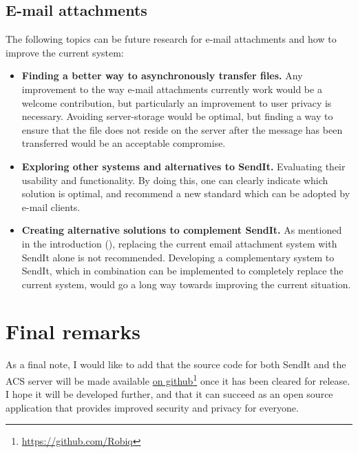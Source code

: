 \subsection{E-mail attachments}
%
The following topics can be future research for e-mail attachments and how to improve the current system:
\begin{itemize}
	\item \textbf{Finding a better way to asynchronously transfer files.} Any improvement to the way e-mail attachments currently work would be a welcome contribution, but particularly an improvement to user privacy is necessary. Avoiding server-storage would be optimal, but finding a way to ensure that the file does not reside on the server after the message has been transferred would be an acceptable compromise.
	\item \textbf{Exploring other systems and alternatives to SendIt.} Evaluating their usability and functionality. By doing this, one can clearly indicate which solution is optimal, and recommend a new standard which can be adopted by e-mail clients.
	\item \textbf{Creating alternative solutions to complement SendIt.} As mentioned in the introduction (), replacing the current email attachment system with SendIt alone is not recommended. Developing a complementary system to SendIt, which in combination can be implemented to completely replace the current system, would go a long way towards improving the current situation.
\end{itemize}
%
\section{Final remarks}
%
As a final note, I would like to add that the source code for both SendIt and the ACS server will be made available \href{https://github.com/Robiq}{on github}\footnote{\href{https://github.com/Robiq}{https://github.com/Robiq}} once it has been cleared for release. I hope it will be developed further, and that it can succeed as an open source application that provides improved security and privacy for everyone.